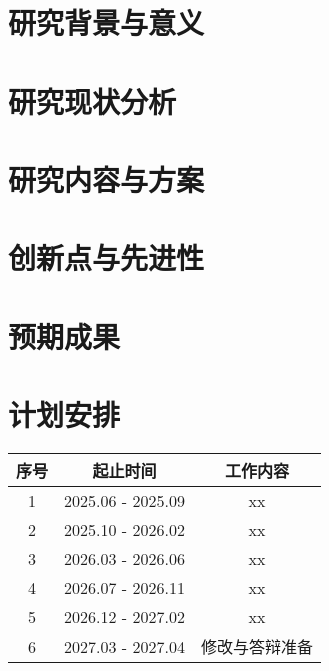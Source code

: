 \documentclass[UTF8, 12pt]{ctexart}
\begin{document}
\newpage
\section{研究背景与意义}

\section{研究现状分析}

\section{研究内容与方案}

\section{创新点与先进性}

\section{预期成果}

\section{计划安排}
\begin{table}[htbp]
\centering
\begin{tabular}{ccc}
\toprule
序号 & 起止时间 & 工作内容 \\
\midrule
1 & 2025.06 - 2025.09 & xx \\
2 & 2025.10 - 2026.02 & xx \\
3 & 2026.03 - 2026.06 & xx \\
4 & 2026.07 - 2026.11 & xx \\
5 & 2026.12 - 2027.02 & xx \\
6 & 2027.03 - 2027.04 & 修改与答辩准备 \\
\bottomrule
\end{tabular}
\end{table}


\end{document}
